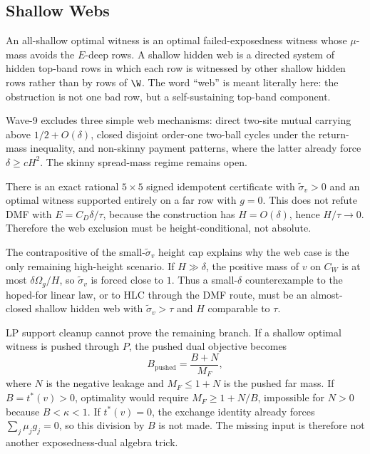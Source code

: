 \subsection{Shallow Webs}

An all-shallow optimal witness is an optimal failed-exposedness witness whose
\(\mu\)-mass avoids the \(E\)-deep rows.  A shallow hidden web is a directed
system of hidden top-band rows in which each row is witnessed by other
shallow hidden rows rather than by rows of \(\W\).  The word ``web'' is meant
literally here: the obstruction is not one bad row, but a self-sustaining
top-band component.

\begin{proposition}
\modauditbadge
Wave-9 excludes three simple web mechanisms: direct two-site mutual carrying
above \(1/2+O(\delta)\), closed disjoint order-one two-ball cycles under the
return-mass inequality, and non-skinny payment patterns, where the latter
already force \(\delta\ge cH^2\).  The skinny spread-mass regime remains
open.
\end{proposition}

\begin{proposition}
\modauditbadge
There is an exact rational \(5\times5\) signed idempotent certificate with
\(\widetilde\sigma_v>0\) and an optimal witness supported entirely on a far
row with \(g=0\).  This does not refute DMF with \(E=C_D\delta/\tau\), because
the construction has \(H=O(\delta)\), hence \(H/\tau\to0\).  Therefore the
web exclusion must be height-conditional, not absolute.
\end{proposition}

The contrapositive of the small-\(\widetilde\sigma_v\) height cap explains
why the web case is the only remaining high-height scenario.  If
\(H\gg\delta\), the positive mass of \(v\) on \(C_W\) is at most
\(\delta\Omega_g/H\), so \(\widetilde\sigma_v\) is forced close to \(1\).
Thus a small-\(\delta\) counterexample to the hoped-for linear law, or to HLC
through the DMF route, must be an almost-closed shallow hidden web with
\(\widetilde\sigma_v>\tau\) and \(H\) comparable to \(\tau\).

\begin{warning}
\provedbadge
LP support cleanup cannot prove the remaining branch.  If a shallow optimal
witness is pushed through \(P\), the pushed dual objective becomes
\[
  B_{\mathrm{pushed}}=\frac{B+N}{M_F},
\]
where \(N\) is the negative leakage and \(M_F\le1+N\) is the pushed far mass.
If \(B=t^*(v)>0\), optimality would require \(M_F\ge1+N/B\), impossible for
\(N>0\) because \(B<\kappa<1\).  If \(t^*(v)=0\), the exchange identity
already forces \(\sum_j\mu_jg_j=0\), so this division by \(B\) is not made.
The missing input is therefore not another exposedness-dual algebra trick.
\end{warning}

